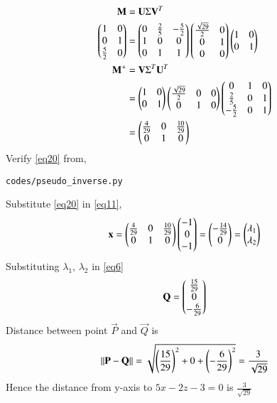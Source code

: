 \documentclass[journal,12pt,twocolumn]{IEEEtran}
\begin{document}
\begin{align}
	\label{eq16}\mathbf{M} &= \mathbf{U}\Sigma\mathbf{V}^T\\
	\label{eq17}\begin{pmatrix}1 & 0\\0 & 1\\\frac{5}{2} & 0\end{pmatrix} &= \begin{pmatrix}0 & \frac{2}{5} & -\frac{5}{2}\\1 & 0 & 0\\0 & 1 & 1\end{pmatrix}\begin{pmatrix}\frac{\sqrt{29}}{2} & 0 \\0 & 1\\0 & 0\end{pmatrix} \begin{pmatrix}1 & 0\\0 & 1\end{pmatrix}\\
	\label{eq18}\mathbf{M}^{+} &= \mathbf{V}\Sigma^T\mathbf{U}^T\\
	\label{eq19}&= \begin{pmatrix}1 & 0\\0 & 1\end{pmatrix}\begin{pmatrix}\frac{\sqrt{29}}{2} & 0 & 0\\0 & 1 & 0\end{pmatrix}\begin{pmatrix}0 & 1 & 0\\\frac{2}{5} & 0 & 1\\-\frac{5}{2} & 0 & 1\end{pmatrix}\\
	\label{eq20}&=\begin{pmatrix}\frac{4}{29} & 0 & \frac{10}{29}\\0 & 1 & 0\end{pmatrix}
\end{align}
Verify \eqref{eq20} from,
\begin{lstlisting}
codes/pseudo_inverse.py
\end{lstlisting}
Substitute \eqref{eq20} in \eqref{eq11},
\begin{align}
	\mathbf{x} = \begin{pmatrix}\frac{4}{29} & 0 & \frac{10}{29}\\0 & 1 & 0\end{pmatrix}\begin{pmatrix}-1\\0\\-1\end{pmatrix} = \begin{pmatrix}-\frac{14}{29}\\0\end{pmatrix} = \begin{pmatrix}\lambda_1 \\ \lambda_2\end{pmatrix}
\end{align}
Substituting $\lambda_1$, $\lambda_2$ in \eqref{eq6}
\begin{equation}
	\mathbf{Q} = \begin{pmatrix}\frac{15}{29}\\0\\-\frac{6}{29}\end{pmatrix}
\end{equation}
Distance between point $\vec{P}$ and $\vec{Q}$ is
\begin{align}
	\left\lVert\mathbf{P}-\mathbf{Q}\right\rVert = \sqrt{\left(\frac{15}{29}\right)^2 + 0 + \left(-\frac{6}{29}\right)^2} = \frac{3}{\sqrt{29}}
\end{align}
Hence the distance from y-axis to $5x - 2z - 3 = 0$ is $\frac{3}{\sqrt{29}}$
\end{document}
